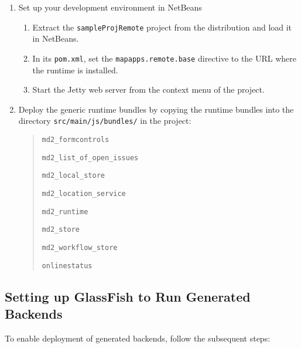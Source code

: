 \begin{enumerate}
\item {Set up your \mapapps  development environment in NetBeans}

\begin{enumerate}
\item Extract the \lstinline|sampleProjRemote| project from the \mapapps distribution and load it in NetBeans. \label{item:extraction}
\item In its \lstinline|pom.xml|,
 set the \lstinline|mapapps.remote.base| directive to the URL where the \mapapps runtime is installed.
\item Start the Jetty web server from the context menu of the project.

\end{enumerate}

\item Deploy the generic \MD runtime bundles by copying the \MD runtime bundles into the directory \lstinline[language=Simple]|src/main/js/bundles/| in the project:
	\begin{quotation}
		 \lstinline|md2_formcontrols|
		 
		 \lstinline|md2_list_of_open_issues|
		 
		 \lstinline|md2_local_store|
		 
		 \lstinline|md2_location_service|
		 
		 \lstinline|md2_runtime|
		 		 
		 \lstinline|md2_store|
		 
		 \lstinline|md2_workflow_store|
		 
		 \lstinline|onlinestatus|
	\end{quotation}



\end{enumerate}

\subsection{Setting up GlassFish to Run Generated Backends}
To enable deployment of generated backends, follow the subsequent steps:


